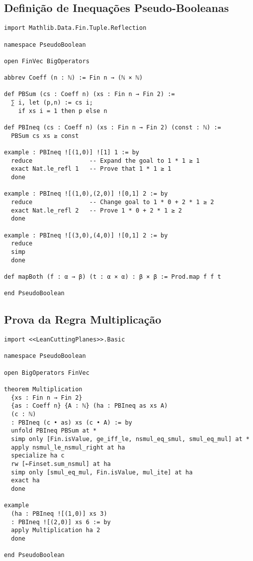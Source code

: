 \documentclass[conference]{IEEEtran}
\begin{document}
\subsection{Definição de Inequações Pseudo-Booleanas}
\begin{verbatim}
import Mathlib.Data.Fin.Tuple.Reflection

namespace PseudoBoolean

open FinVec BigOperators

abbrev Coeff (n : ℕ) := Fin n → (ℕ × ℕ)

def PBSum (cs : Coeff n) (xs : Fin n → Fin 2) :=
  ∑ i, let (p,n) := cs i;
    if xs i = 1 then p else n

def PBIneq (cs : Coeff n) (xs : Fin n → Fin 2) (const : ℕ) :=
  PBSum cs xs ≥ const

example : PBIneq ![(1,0)] ![1] 1 := by
  reduce                -- Expand the goal to 1 * 1 ≥ 1
  exact Nat.le_refl 1   -- Prove that 1 * 1 ≥ 1
  done

example : PBIneq ![(1,0),(2,0)] ![0,1] 2 := by
  reduce                -- Change goal to 1 * 0 + 2 * 1 ≥ 2
  exact Nat.le_refl 2   -- Prove 1 * 0 + 2 * 1 ≥ 2
  done

example : PBIneq ![(3,0),(4,0)] ![0,1] 2 := by
  reduce
  simp
  done

def mapBoth (f : α → β) (t : α × α) : β × β := Prod.map f f t

end PseudoBoolean
\end{verbatim}
\newpage

\subsection{Prova da Regra Multiplicação}
\begin{verbatim}
import <<LeanCuttingPlanes>>.Basic

namespace PseudoBoolean

open BigOperators FinVec

theorem Multiplication
  {xs : Fin n → Fin 2}
  {as : Coeff n} {A : ℕ} (ha : PBIneq as xs A)
  (c : ℕ)
  : PBIneq (c • as) xs (c • A) := by
  unfold PBIneq PBSum at *
  simp only [Fin.isValue, ge_iff_le, nsmul_eq_smul, smul_eq_mul] at *
  apply nsmul_le_nsmul_right at ha
  specialize ha c
  rw [←Finset.sum_nsmul] at ha
  simp only [smul_eq_mul, Fin.isValue, mul_ite] at ha
  exact ha
  done

example
  (ha : PBIneq ![(1,0)] xs 3)
  : PBIneq ![(2,0)] xs 6 := by
  apply Multiplication ha 2
  done

end PseudoBoolean
\end{verbatim}
\newpage
\end{document}
